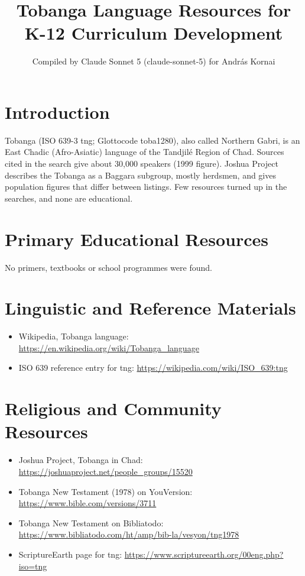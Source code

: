 \documentclass[12pt]{article}
\title{Tobanga Language Resources for K-12 Curriculum Development}
\author{Compiled by Claude Sonnet 5 (claude-sonnet-5) for Andr\'as Kornai}
\date{}
\begin{document}
\maketitle

\section{Introduction}
Tobanga (ISO 639-3 tng; Glottocode toba1280), also called Northern Gabri, is an East Chadic (Afro-Asiatic) language of the Tandjil\'e Region of Chad. Sources cited in the search give about 30,000 speakers (1999 figure). Joshua Project describes the Tobanga as a Baggara subgroup, mostly herdsmen, and gives population figures that differ between listings. Few resources turned up in the searches, and none are educational.

\section{Primary Educational Resources}
No primers, textbooks or school programmes were found.

\section{Linguistic and Reference Materials}
\begin{itemize}
\item Wikipedia, Tobanga language: \url{https://en.wikipedia.org/wiki/Tobanga_language}
\item ISO 639 reference entry for tng: \url{https://wikipedia.com/wiki/ISO_639:tng}
\end{itemize}

\section{Religious and Community Resources}
\begin{itemize}
\item Joshua Project, Tobanga in Chad: \url{https://joshuaproject.net/people_groups/15520}
\item Tobanga New Testament (1978) on YouVersion: \url{https://www.bible.com/versions/3711}
\item Tobanga New Testament on Bibliatodo: \url{https://www.bibliatodo.com/ht/amp/bib-la/vesyon/tng1978}
\item ScriptureEarth page for tng: \url{https://www.scriptureearth.org/00eng.php?iso=tng}
\end{itemize}
\end{document}
